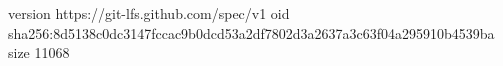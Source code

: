 version https://git-lfs.github.com/spec/v1
oid sha256:8d5138c0dc3147fccac9b0dcd53a2df7802d3a2637a3c63f04a295910b4539ba
size 11068

